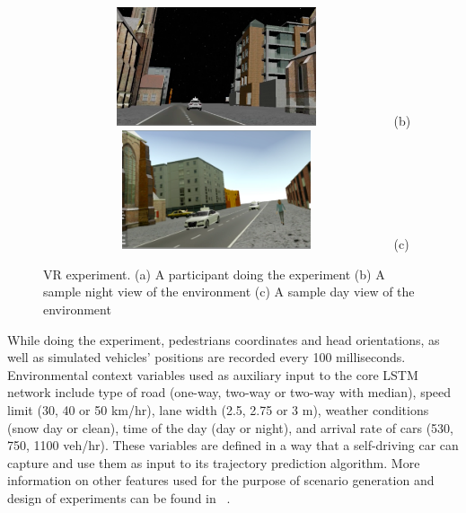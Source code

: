 \begin{figure}[!h]
\centering
{}
\usebox{\measurebox}\qquad
    \begin{minipage}[b][\ht\measurebox][s]{.4\textwidth}
    \centering
    \subfloat
    {\label{fig:figB}\includegraphics[width=0.91\textwidth,height=3.5cm]{chapter_6/figures/img3.png}}
    (b)
    \vfill
    \subfloat
    {\label{fig:figC}\includegraphics[width=0.91\textwidth,height=3.5cm]{chapter_6/figures/pic1.png}}
    (c)
    \end{minipage}
\caption{VR experiment. (a) A participant doing the experiment (b) A sample night view of the environment (c) A sample day view of the environment}
\label{fig:exp}
\end{figure}
While doing the experiment, pedestrians coordinates and head orientations, as well as simulated vehicles' positions are recorded every 100 milliseconds. Environmental context variables used as auxiliary input to the core LSTM network include type of road (one-way, two-way or two-way with median), speed limit (30, 40 or 50 km/hr), lane width (2.5, 2.75 or 3 m), weather conditions (snow day or clean), time of the day (day or night), and arrival rate of cars (530, 750, 1100 veh/hr). These variables are defined in a way that a self-driving car can capture and use them as input to its trajectory prediction algorithm. More information on other features used for the purpose of scenario generation and design of experiments can be found in ~\citep{kalatian2019deepsurvival}.  